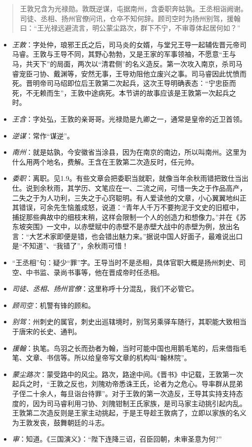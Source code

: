 \documentclass[]{book}
\providecommand{\tightlist}{%
  \setlength{\itemsep}{0pt}\setlength{\parskip}{0pt}}
\begin{document}
\begin{quote}
王敦兄含为光禄勋。敦既逆谋，屯据南州，含委职奔姑孰。王丞相诣阙谢。司徒、丞相、扬州官僚问讯，仓卒不知何辞。顾司空时为扬州别驾，援翰曰：``王光禄远避流言，明公蒙尘路次，群下不宁，不审尊体起居何如？''
\end{quote}

\begin{itemize}
\tightlist
\item
  \emph{王敦}：字处仲，琅邪王氏之后，司马炎的女婿，与堂兄王导一起辅佐晋元帝司马睿。王敦与王导不同，其野心勃勃，又是王家的军事领袖，不愿意``王与马，共天下''的局面，两次以``清君侧''的名义造反。第一次攻入南京，杀司马睿宠臣刁协、戴渊等，安然无事，王导劝阻他立废兴之事。司马睿因此忧愤而死。晋明帝司马绍即位后王敦第二次起兵，这次王导明确表态：``宁忠臣而死，不无赖而生''，王敦中途病死。本节讲的故事应该是王敦第一次起兵之时。
\item
  \emph{王含}：字处弘，王敦的亲哥哥。光禄勋是九卿之一，通常是皇帝的近卫首领。
\item
  \emph{逆谋}：常作``谋逆''。
\item
  \emph{南州}：就是姑孰，今安徽省当涂县，因为在南京的南边，所以叫南州。这里为什么用两个地名，费解。王含在王敦第二次造反时，任元帅。
\item
  \emph{委职}：离职。见1.9。有些文章会把委职当就职，就像当年余秋雨错把致仕当出仕。说到余秋雨，其学历、文笔应在一、二流之间，可惜一失之于作品高产，二失之于为人功利，三失之于心窍聪明。有人爱读他的文章，小心翼翼地纠正其错误，可余先生恼羞成怒，说道：``青年人千万不要拘泥于文史的旧框中，捕捉那些典故中的细枝末稍，这样会限制一个人的创造力和想像力。''并在《苏东坡突围》一文中，以赤壁赋中的赤壁不是赤壁大战中的赤壁为例，放出名言：``大艺术家即便是错，也会错出魅力来。''据说中国人好面子，最难说出口是``不知道''、``我错了''，余秋雨可惜！
\item
  ``王丞相''句：疑少``罪''字。王导当时不是丞相，具体官职大概是扬州刺史、司空、中书监、录尚书事等，他在晋成帝时任丞相。
\item
  \emph{司徒、丞相、扬州官僚}：这里称呼十分混乱，我们不必管它。
\item
  \emph{顾司空}：机警有锋的顾和。
\item
  \emph{别驾}：州刺史的属官，刺史出巡辖境时，别驾另乘驿车随行，其职能大致相当于唐宋的长史、通判。
\item
  \emph{援翰}：执笔。鸟羽之长而劲者为翰，当时可能中国也用鹅毛笔的，后来借指毛笔、文章、书信等。所以给皇帝写文章的机构叫``翰林院''。
\item
  \emph{蒙尘路次}：蒙受路中的风尘。路次，路途中间。《晋书》中记载，王敦第一次起兵之时，``王敦之反也，刘隗劝帝悉诛王氏，论者为之危心。导率群从昆弟子侄二十余人，每旦诣台待罪''。对于王敦的第一次造反，王导其实持支持态度的，因为司马睿利用刁协、刘隗钳制王氏家族，是司马家主动挑引起内乱。王敦第二次造反则是王家主动挑起，于是王导趁王敦病了，立即以家族的名义为王敦发丧，鼓舞朝廷的斗志。
\item
  \emph{审}：知道。《三国演义》：``陛下连降三诏，召臣回朝，未审圣意为何?''
\end{itemize}
\end{document}

